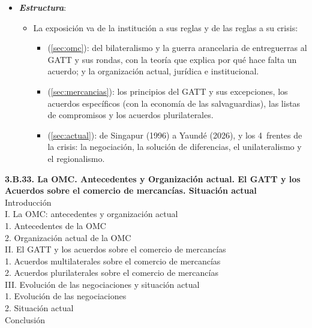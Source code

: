 \documentclass[11pt]{article}
\begin{document}
\begin{itemize}
\item \textbf{\emph{Estructura}}:
  \begin{itemize}
  \item La exposición va de la institución a sus reglas y de las reglas a su crisis:
    \begin{itemize}
    \item {} (\ref{sec:omc}): del bilateralismo y la guerra arancelaria de entreguerras al GATT y sus rondas, con la teoría que explica por qué hace falta un acuerdo; y la organización actual, jurídica e institucional.
    \item {} (\ref{sec:mercancias}): los principios del GATT y sus excepciones, los acuerdos específicos (con la economía de las salvaguardias), las listas de compromisos y los acuerdos plurilaterales.
    \item {} (\ref{sec:actual}): de Singapur (1996) a Yaundé (2026), y los 4~frentes de la crisis: la negociación, la solución de diferencias, el unilateralismo y el regionalismo.
    \end{itemize}
  \end{itemize}
\end{itemize}

\begin{esquema}[unbreakable]
\textbf{3.B.33. La OMC. Antecedentes y Organización actual. El GATT y los Acuerdos sobre el comercio de mercancías. Situación actual}\\[2pt]
Introducción\\
I. La OMC: antecedentes y organización actual\\
\hspace*{1.5em}1. Antecedentes de la OMC\\
\hspace*{1.5em}2. Organización actual de la OMC\\
II. El GATT y los acuerdos sobre el comercio de mercancías\\
\hspace*{1.5em}1. Acuerdos multilaterales sobre el comercio de mercancías\\
\hspace*{1.5em}2. Acuerdos plurilaterales sobre el comercio de mercancías\\
III. Evolución de las negociaciones y situación actual\\
\hspace*{1.5em}1. Evolución de las negociaciones\\
\hspace*{1.5em}2. Situación actual\\
Conclusión
\end{esquema}
\end{document}
